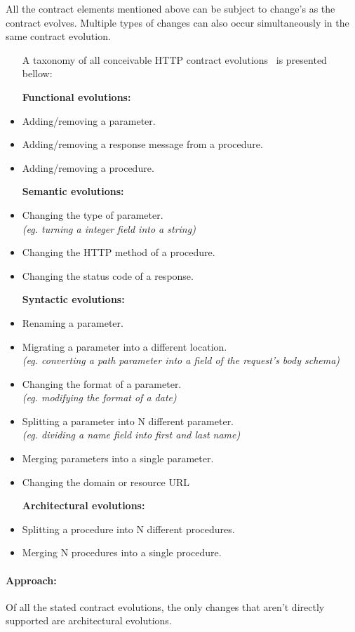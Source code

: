 All the contract elements mentioned above can be subject to change's as the contract evolves.
Multiple types of changes can also occur simultaneously in the same contract evolution.
\begin{itemize}
    \setlength\itemsep{0em}
    \item [A taxonomy of all conceivable HTTP contract evolutions~\cite{list} is presented bellow:]
    \item [\textbf{Functional evolutions:}]
    \item Adding/removing a parameter.
    \item Adding/removing a response message from a procedure.
    \item Adding/removing a procedure.
    \item [\textbf{Semantic evolutions:}]
    \item Changing the type of parameter. \\ \textit{(eg. turning a integer field into a string)}
    \item Changing the HTTP method of a procedure.
    \item Changing the status code of a response.
    \item [\textbf{Syntactic evolutions:}]
    \item Renaming a parameter.
    \item Migrating a parameter into a different location. \\ \textit{(eg. converting a path parameter into a field of the request's body schema)}
    \item Changing the format of a parameter. \\ \textit{(eg. modifying the format of a date)}
    \item Splitting a parameter into N different parameter. \\ \textit{(eg. dividing a name field into first and last name)}
    \item Merging parameters into a single parameter.
    \item Changing the domain or resource URL
    \item [\textbf{Architectural evolutions:}]
    \item Splitting a procedure into N different procedures.
    \item Merging N procedures into a single procedure.
\end{itemize}

\paragraph{Approach:}
Of all the stated contract evolutions, the only changes that aren't directly supported are architectural evolutions.

